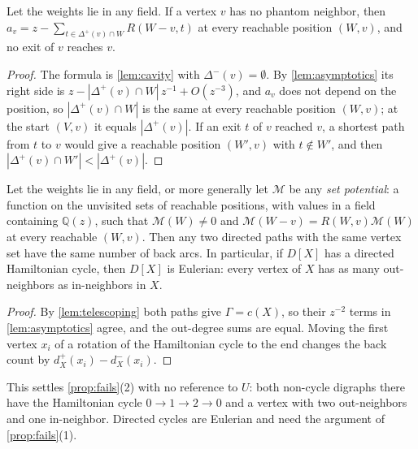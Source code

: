 \documentclass[final]{siamart0516}
\numberwithin{theorem}{section}
\numberwithin{equation}{section}
\theoremstyle{siamnonum}
\theoremstyle{plain}
\newcommand{\QQ}{\mathbb{Q}}
\newcommand{\Qz}{\QQ(z)}
\newcommand{\Mpot}{\mathcal{M}}           %
\begin{document}
\begin{theorem}\label{thm:no-phantom}
Let the weights lie in any field. If a vertex $v$ has no phantom neighbor, then $a_v=z-\sum_{t\in\Delta^{+}(v)\cap W}R(W-v,t)$ at every reachable position $(W,v)$, and no exit of $v$ reaches $v$.
\end{theorem}
\begin{proof}
The formula is \cref{lem:cavity} with $\Delta^{-}(v)=\emptyset$. By \cref{lem:asymptotics} its right side is $z-|\Delta^{+}(v)\cap W|\,z^{-1}+O(z^{-3})$, and $a_v$ does not depend on the position, so $|\Delta^{+}(v)\cap W|$ is the same at every reachable position $(W,v)$; at the start $(V,v)$ it equals $|\Delta^{+}(v)|$. If an exit $t$ of $v$ reached $v$, a shortest path from $t$ to $v$ would give a reachable position $(W',v)$ with $t\notin W'$, and then $|\Delta^{+}(v)\cap W'|<|\Delta^{+}(v)|$.
\end{proof}

\begin{theorem}\label{thm:cocycle}
Let the weights lie in any field, or more generally let $\Mpot$ be any \emph{set potential}: a function on the unvisited sets of reachable positions, with values in a field containing $\Qz$, such that $\Mpot(W)\neq0$ and $\Mpot(W-v)=R(W,v)\Mpot(W)$ at every reachable $(W,v)$. Then any two directed paths with the same vertex set have the same number of back arcs. In particular, if $D[X]$ has a directed Hamiltonian cycle, then $D[X]$ is Eulerian: every vertex of $X$ has as many out-neighbors as in-neighbors in $X$.
\end{theorem}
\begin{proof}
By \cref{lem:telescoping} both paths give $\Gamma=c(X)$, so their $z^{-2}$ terms in \cref{lem:asymptotics} agree, and the out-degree sums are equal. Moving the first vertex $x_i$ of a rotation of the Hamiltonian cycle to the end changes the back count by $d^{+}_X(x_i)-d^{-}_X(x_i)$.
\end{proof}

This settles \cref{prop:fails}(2) with no reference to $U$: both non-cycle digraphs there have the Hamiltonian cycle $0\to1\to2\to0$ and a vertex with two out-neighbors and one in-neighbor. Directed cycles are Eulerian and need the argument of \cref{prop:fails}(1).
\end{document}
